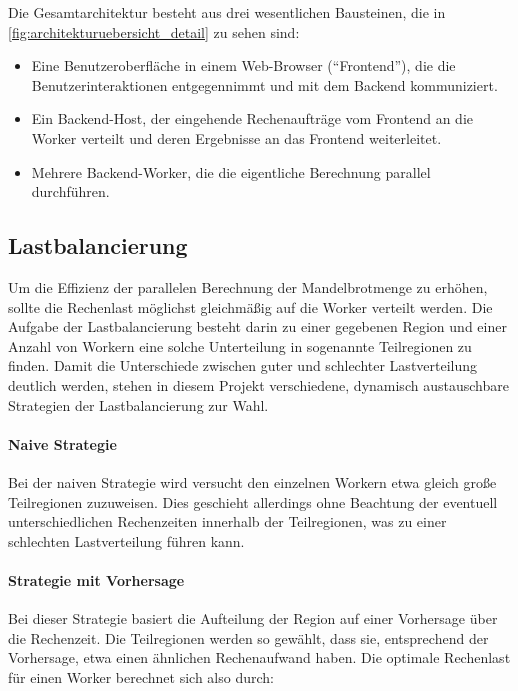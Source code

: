Die Gesamtarchitektur besteht aus drei wesentlichen Bausteinen, die in \autoref{fig:architekturuebersicht_detail} zu sehen sind:
\begin{itemize}
	\item Eine Benutzeroberfläche in einem Web-Browser (“Frontend”), die die Benutzerinteraktionen entgegennimmt und mit dem Backend kommuniziert.
	\item Ein Backend-Host, der eingehende Rechenaufträge vom Frontend an die Worker verteilt und deren Ergebnisse an das Frontend weiterleitet.
	\item Mehrere Backend-Worker, die die eigentliche Berechnung parallel durchführen.
\end{itemize}

\subsection{Lastbalancierung}\label{sec:load_balancing_concepts}
Um die Effizienz der parallelen Berechnung der Mandelbrotmenge zu erhöhen, sollte die Rechenlast möglichst gleichmäßig auf die Worker verteilt werden.
Die Aufgabe der Lastbalancierung besteht darin zu einer gegebenen Region und einer Anzahl von Workern eine solche Unterteilung in sogenannte Teilregionen zu finden.
Damit die Unterschiede zwischen guter und schlechter Lastverteilung deutlich werden, stehen in diesem Projekt verschiedene, dynamisch austauschbare Strategien der Lastbalancierung zur Wahl.

\paragraph{Naive Strategie}
Bei der naiven Strategie wird versucht den einzelnen Workern etwa gleich große Teilregionen zuzuweisen.
Dies geschieht allerdings ohne Beachtung der eventuell unterschiedlichen Rechenzeiten innerhalb der Teilregionen, was zu einer schlechten Lastverteilung führen kann.

\paragraph{Strategie mit Vorhersage}
Bei dieser Strategie basiert die Aufteilung der Region auf einer Vorhersage über die Rechenzeit.
Die Teilregionen werden so gewählt, dass sie, entsprechend der Vorhersage, etwa einen ähnlichen Rechenaufwand haben.
Die optimale Rechenlast für einen Worker berechnet sich also durch:

